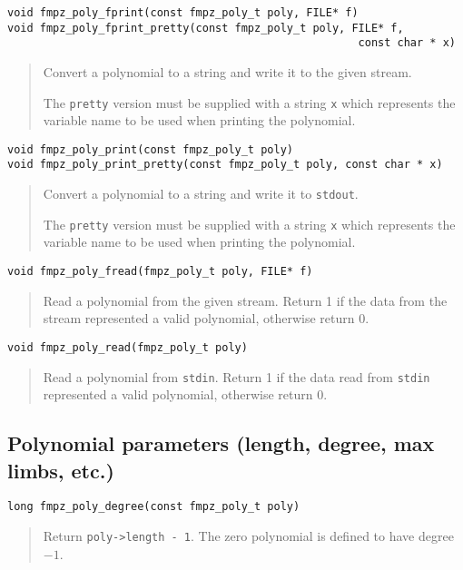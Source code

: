 \documentclass[a4paper,10pt]{article}
\newcommand{\code}{\lstinline}
\begin{document}
\begin{lstlisting}
void fmpz_poly_fprint(const fmpz_poly_t poly, FILE* f)
void fmpz_poly_fprint_pretty(const fmpz_poly_t poly, FILE* f, 
                                                      const char * x)
\end{lstlisting}
\begin{quote}
Convert a polynomial to a string and write it to the given stream. 

The \code{pretty} version must be supplied with a string \code{x} which represents the variable name to be used when printing the polynomial.
\end{quote}

\begin{lstlisting}
void fmpz_poly_print(const fmpz_poly_t poly)
void fmpz_poly_print_pretty(const fmpz_poly_t poly, const char * x)
\end{lstlisting}
\begin{quote}
Convert a polynomial to a string and write it to \code{stdout}. 

The \code{pretty} version must be supplied with a string \code{x} which represents the variable name to be used when printing the polynomial.
\end{quote}

\begin{lstlisting}
void fmpz_poly_fread(fmpz_poly_t poly, FILE* f)
\end{lstlisting}
\begin{quote}
Read a polynomial from the given stream. Return 1 if the data from the stream represented a valid polynomial, otherwise return 0.
\end{quote}

\begin{lstlisting}
void fmpz_poly_read(fmpz_poly_t poly)
\end{lstlisting}
\begin{quote}
Read a polynomial from \code{stdin}. Return 1 if the data read from \code{stdin} represented a valid polynomial, otherwise return 0.
\end{quote}

\subsection{Polynomial parameters (length, degree, max limbs, etc.)}

\begin{lstlisting}
long fmpz_poly_degree(const fmpz_poly_t poly)
\end{lstlisting}
\begin{quote}
Return \code{poly->length - 1}. The zero polynomial is defined to have degree $-1$.
\end{quote}
\end{document}
